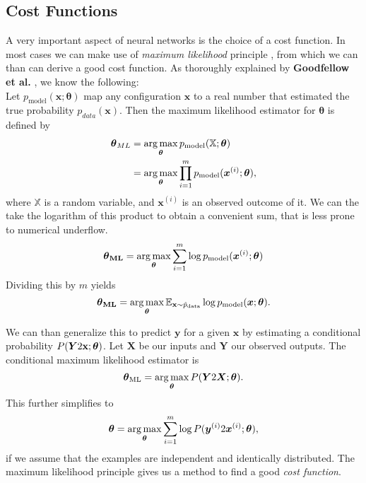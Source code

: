\subsection{Cost Functions}
\label{sec:cost-functions}

A very important aspect of neural networks is the choice of a cost function.
In most cases we can make use of \emph{maximum likelihood} principle \cite{Cramer:444796}, from which we can than can derive a good cost function.
As thoroughly explained by \textbf{Goodfellow et al.} \cite{Goodfellow-et-al-2016}, we know the following: \\

Let \(p_{\text{model}}(\boldsymbol{x}; \boldsymbol{\theta})\) map any configuration \(\boldsymbol{x}\) to a real number that estimated the true probability \(p_{data}(\boldsymbol{x})\).
Then the maximum likelihood estimator for \(\boldsymbol{\theta}\) is defined by
\begin{align}
    \boldsymbol{\theta}_{ML} &= \operatorname*{arg\,max}_{\boldsymbol{\theta}} p_{\text{model}} (\mathbb{X}; \boldsymbol{\theta}) \\
    &= \operatorname*{arg\,max}_{\boldsymbol{\theta}} \prod^{m}_{i = 1} p_{\text{model}} (\boldsymbol{x}^{(i)}; \boldsymbol{\theta}),
\end{align}
where \(\mathbb{X}\) is a random variable, and \(\boldsymbol{x}^{(i)}\) is an observed outcome of it.
We can the take the logarithm of this product to obtain a convenient sum, that is less prone to numerical underflow.
\begin{equation}
    \boldsymbol{\theta}_{\textbf{ML}} = \operatorname*{arg\,max}_{\boldsymbol{\theta}} \sum^{m}_{i = 1} \log p_{\text{model}} (\boldsymbol{x}^{(i)}; \boldsymbol{\theta})
\end{equation}
Dividing this by \(m\) yields
\begin{equation}
    \boldsymbol{\theta}_{\textbf{ML}} = \operatorname*{arg\,max}_{\boldsymbol{\theta}} \mathbb{E}_{\mathbf{x} \sim \hat{p}_{\text{data}}} \log p_{\text{model}} (\boldsymbol{x}; \boldsymbol{\theta}).
\end{equation}

We can than generalize this to predict \(\boldsymbol{y}\) for a given \(\boldsymbol{x}\) by estimating a conditional probability \(P(\boldsymbol{Y} 2 \mathbf{x}; \boldsymbol{\theta})\).
Let \(\boldsymbol{X}\) be our inputs and \(\boldsymbol{Y}\) our observed outputs.
The conditional maximum likelihood estimator is
\begin{equation}
    \boldsymbol{\theta}_{\text{ML}} = \operatorname*{arg\,max}_{\boldsymbol{\theta}} P (\boldsymbol{Y} 2 \boldsymbol{X}; \boldsymbol{\theta}).
\end{equation}
This further simplifies to
\begin{equation}
    \boldsymbol{\theta} = \operatorname*{arg\,max}_{\boldsymbol{\theta}} \sum^{m}_{i = 1} \log P (\boldsymbol{y}^{(i)} 2 \boldsymbol{x}^{(i)}; \boldsymbol{\theta}),
\end{equation}
if we assume that the examples are independent and identically distributed.
The maximum likelihood principle gives us a method to find a good \emph{cost function}.

